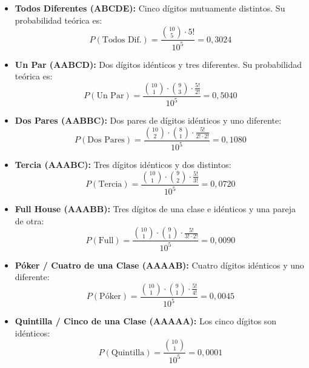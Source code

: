 \documentclass{article}
\begin{document}
\begin{itemize}
    \item \textbf{Todos Diferentes (ABCDE):} Cinco dígitos mutuamente distintos. Su probabilidad teórica es:
    \begin{equation}
        P(\text{Todos Dif.}) = \frac{\binom{10}{5} \cdot 5!}{10^5} = 0,3024
    \end{equation}
    \item \textbf{Un Par (AABCD):} Dos dígitos idénticos y tres diferentes. Su probabilidad teórica es:
    \begin{equation}
        P(\text{Un Par}) = \frac{\binom{10}{1} \cdot \binom{9}{3} \cdot \frac{5!}{2!}}{10^5} = 0,5040
    \end{equation}
    \item \textbf{Dos Pares (AABBC):} Dos pares de dígitos idénticos y uno diferente:
    \begin{equation}
        P(\text{Dos Pares}) = \frac{\binom{10}{2} \cdot \binom{8}{1} \cdot \frac{5!}{2! \cdot 2!}}{10^5} = 0,1080
    \end{equation}
    \item \textbf{Tercia (AAABC):} Tres dígitos idénticos y dos distintos:
    \begin{equation}
        P(\text{Tercia}) = \frac{\binom{10}{1} \cdot \binom{9}{2} \cdot \frac{5!}{3!}}{10^5} = 0,0720
    \end{equation}
    \item \textbf{Full House (AAABB):} Tres dígitos de una clase e idénticos y una pareja de otra:
    \begin{equation}
        P(\text{Full}) = \frac{\binom{10}{1} \cdot \binom{9}{1} \cdot \frac{5!}{3! \cdot 2!}}{10^5} = 0,0090
    \end{equation}
    \item \textbf{Póker / Cuatro de una Clase (AAAAB):} Cuatro dígitos idénticos y uno diferente:
    \begin{equation}
        P(\text{Póker}) = \frac{\binom{10}{1} \cdot \binom{9}{1} \cdot \frac{5!}{4!}}{10^5} = 0,0045
    \end{equation}
    \item \textbf{Quintilla / Cinco de una Clase (AAAAA):} Los cinco dígitos son idénticos:
    \begin{equation}
        P(\text{Quintilla}) = \frac{\binom{10}{1}}{10^5} = 0,0001
    \end{equation}
\end{itemize}
\end{document}
